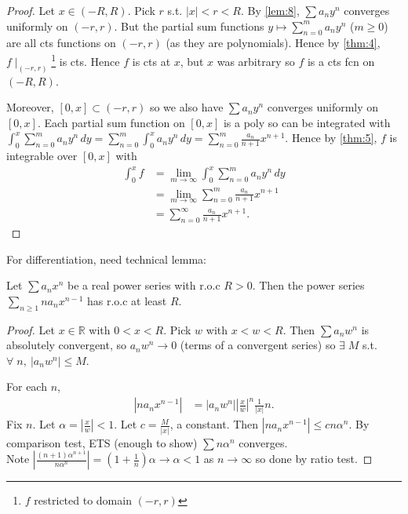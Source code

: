 \begin{proof}
    Let $x \in (-R, R)$.
    Pick $r$ s.t. $|x| < r < R$.
    By \cref{lem:8}, $\sum a_n y^n$ converges uniformly on $(-r, r)$.
    But the partial sum functions $y \mapsto \sum_{n=0}^{m} a_n y^n$ ($m \geq 0$) are all cts functions on $(-r, r)$ (as they are polynomials).
    Hence by \cref{thm:4}, $f \mid_{(-r, r)}$\footnote{$f$ restricted to domain $(-r, r)$} is cts.
    Hence $f$ is cts at $x$, but $x$ was arbitrary so $f$ is a cts fcn on $(-R, R)$.

    Moreover, $[0, x] \subset (-r, r)$ so we also have $\sum a_n y^n$ converges uniformly on $[0, x]$.
    Each partial sum function on $[0, x]$ is a poly so can be integrated with $\int_0^x \sum_{n=0}^{m} a_n y^n \,dy = \sum_{n=0}^{m} \int_{0}^{x} a_n y^n \,dy = \sum_{n=0}^{m} \frac{a_n}{n + 1} x^{n+1}$.
    Hence by \cref{thm:5}, $f$ is integrable over $[0, x]$ with
    \begin{align*}
        \int_{0}^{x} f &= \lim_{m \to \infty} \int_{0}^{x} \sum_{n=0}^{m} a_n y^n \,dy \\
        &= \lim_{m \to \infty} \sum_{n=0}^{m} \frac{a_n}{n + 1} x^{n + 1} \\
        &= \sum_{n=0}^{\infty} \frac{a_n}{n + 1} x^{n+1}.
    \end{align*} 
\end{proof} 

For differentiation, need technical lemma:
\begin{lemma} \label{lem:10}
    Let $\sum a_n x^n$ be a real power series with r.o.c $R > 0$.
    Then the power series $\sum_{n \geq 1} n a_n x^{n - 1}$ has r.o.c at least $R$.
\end{lemma} 

\begin{proof}
    Let $x \in \mathbb{R}$ with $0 < x < R$.
    Pick $w$ with $x < w < R$.
    Then $\sum a_n w^n$ is absolutely convergent, so $a_n w^n \to 0$ (terms of a convergent series) so $\exists \; M$ s.t. $\forall \; n,\ |a_n w^n| \leq M$.

    For each $n$, 
    \begin{align*}
        |n a_n x^{n - 1}| &= |a_n w^n| \left| \frac{x}{w} \right|^n \frac{1}{|x|} n.
    \end{align*} 
    Fix $n$.
    Let $\alpha = \left| \frac{x}{w} \right| < 1$.
    Let $c = \frac{M}{|x|}$, a constant.
    Then $|n a_n x^{n - 1}| \leq c n \alpha^n$.
    By comparison test, ETS (enough to show) $\sum n \alpha^n$ converges. \\
    Note $\left| \frac{(n + 1) \alpha^{n + 1}}{n \alpha^n} \right| = (1 + \frac{1}{n}) \alpha \to \alpha < 1$ as $n \to \infty$ so done by ratio test.
\end{proof} 

